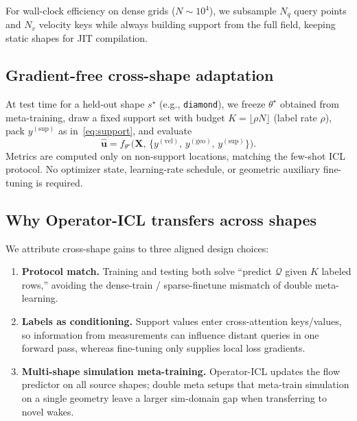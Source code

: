 \documentclass[11pt,a4paper]{article}
\begin{document}
For wall-clock efficiency on dense grids ($N\sim 10^{4}$), we subsample $N_q$ query points and $N_v$ velocity keys while always building support from the full field, keeping static shapes for JIT compilation.

\subsection{Gradient-free cross-shape adaptation}
\label{sec:adapt}

At test time for a held-out shape $s^{\star}$ (e.g., \texttt{diamond}), we freeze $\theta^{\star}$ obtained from meta-training, draw a fixed support set with budget $K=\lfloor \rho N\rfloor$ (label rate $\rho$), pack $y^{(\mathrm{sup})}$ as in~\eqref{eq:support}, and evaluate
\begin{equation}
\hat{\mathbf{u}}
=f_{\theta^{\star}}\bigl(\mathbf{X},\,
\{y^{(\mathrm{vel})},\,y^{(\mathrm{geo})},\,y^{(\mathrm{sup})}\}\bigr).
\end{equation}
Metrics are computed only on non-support locations, matching the few-shot ICL protocol.
No optimizer state, learning-rate schedule, or geometric auxiliary fine-tuning is required.

\subsection{Why Operator-ICL transfers across shapes}
\label{sec:why}

We attribute cross-shape gains to three aligned design choices:

\begin{enumerate}[leftmargin=1.2em]
    \item \textbf{Protocol match.} Training and testing both solve ``predict $\mathcal{Q}$ given $K$ labeled rows,'' avoiding the dense-train / sparse-finetune mismatch of double meta-learning.
    \item \textbf{Labels as conditioning.} Support values enter cross-attention keys/values, so information from measurements can influence distant queries in one forward pass, whereas fine-tuning only supplies local loss gradients.
    \item \textbf{Multi-shape simulation meta-training.} Operator-ICL updates the flow predictor on all source shapes; double meta setups that meta-train simulation on a single geometry leave a larger sim-domain gap when transferring to novel wakes.
\end{enumerate}
\end{document}
